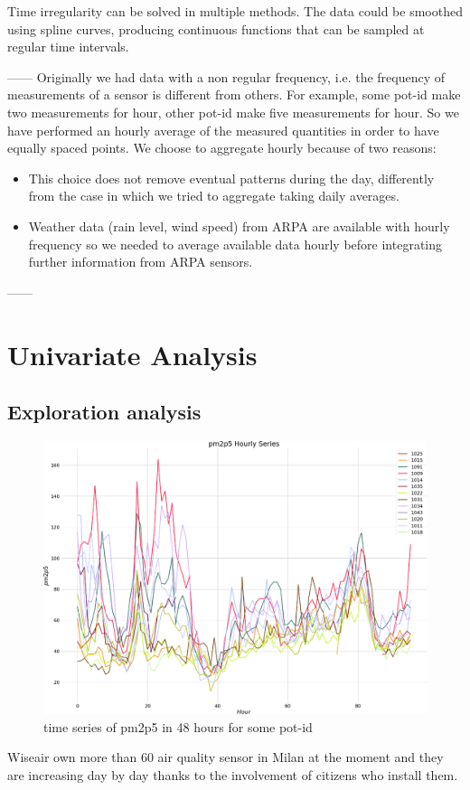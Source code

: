 \documentclass{article}
\begin{document}
Time irregularity can be solved in multiple methods. The data could be smoothed using spline curves, producing continuous functions that can be sampled at 
regular time intervals. 


------
Originally we had data with a non regular frequency, i.e. the frequency of measurements of a sensor 
is different from others. For example, some pot-id make two measurements for hour, other pot-id make 
five measurements for hour. So we have performed an hourly average of the measured quantities in order to have equally spaced points. We choose to aggregate hourly because of two reasons: 
\begin{itemize}
\item This choice does not remove eventual patterns during the day, differently from the case in which we tried to aggregate taking daily averages. 
\item Weather data (rain level, wind speed) from ARPA are available with hourly frequency so we needed to average 
available data hourly before integrating further information from ARPA sensors. 
\end{itemize}

------
\newpage
\section{\textbf{Univariate Analysis}}
\subsection{Exploration analysis}
\begin{figure}[h!]
    \centering
    \includegraphics[scale=0.3]{plotDati.png}
    \caption{time series of pm2p5 in 48 hours for some pot-id}
\end{figure}
Wiseair own more than 60 air quality sensor in Milan at the moment and they are increasing day by day thanks to the involvement of citizens who install them.\\ 
\end{document}
